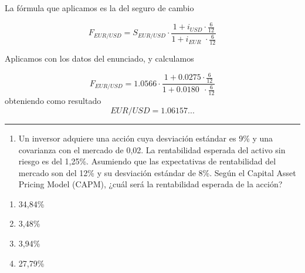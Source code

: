 \documentclass[
  letterpaper,
  DIV=11,
  numbers=noendperiod]{scrreprt}
\providecommand{\tightlist}{%
  \setlength{\itemsep}{0pt}\setlength{\parskip}{0pt}}\usepackage{longtable,booktabs,array}
\begin{document}
\begin{tcolorbox}
\begin{tcolorbox}[enhanced jigsaw, toprule=.15mm, left=2mm, breakable, opacitybacktitle=0.6, toptitle=1mm, coltitle=black, arc=.35mm, leftrule=.75mm, bottomtitle=1mm, titlerule=0mm, title=\textcolor{quarto-callout-tip-color}{\faLightbulb}\hspace{0.5em}{Solución}, rightrule=.15mm, opacityback=0, bottomrule=.15mm, colback=white, colframe=quarto-callout-tip-color-frame, colbacktitle=quarto-callout-tip-color!10!white]

La fórmula que aplicamos es la del seguro de cambio

\[F_{EUR/USD}=S_{EUR/USD}\cdot \frac{1+i_{USD}\cdot \frac{6}{12}}{1+i_{EUR\:\:}\cdot \frac{6}{12}}\]

Aplicamos con los datos del enunciado, y calculamos

\[F_{EUR/USD}=1.0566\cdot \frac{1+0.0275\cdot \frac{6}{12}}{1+0.0180\:\:\cdot \frac{6}{12}}\]
obteniendo como resultado \[EUR/USD = 1.06157...\]

\end{tcolorbox}

\begin{center}\rule{0.5\linewidth}{0.5pt}\end{center}

\begin{enumerate}
\def\labelenumi{\arabic{enumi}.}
\setcounter{enumi}{17}
\tightlist
\item
  Un inversor adquiere una acción cuya desviación estándar es 9\% y una
  covarianza con el mercado de 0,02. La rentabilidad esperada del activo
  sin riesgo es del 1,25\%. Asumiendo que las expectativas de
  rentabilidad del mercado son del 12\% y su desviación estándar de 8\%.
  Según el Capital Asset Pricing Model (CAPM), ¿cuál será la
  rentabilidad esperada de la acción?
\end{enumerate}

\begin{enumerate}
\def\labelenumi{\alph{enumi}.}
\item
  34,84\%
\item
  3,48\%
\item
  3,94\%
\item
  27,79\%
\end{enumerate}

\begin{tcolorbox}[enhanced jigsaw, toprule=.15mm, left=2mm, breakable, opacitybacktitle=0.6, toptitle=1mm, coltitle=black, arc=.35mm, leftrule=.75mm, bottomtitle=1mm, titlerule=0mm, title=\textcolor{quarto-callout-tip-color}{\faLightbulb}\hspace{0.5em}{Solución}, rightrule=.15mm, opacityback=0, bottomrule=.15mm, colback=white, colframe=quarto-callout-tip-color-frame, colbacktitle=quarto-callout-tip-color!10!white]


\end{tcolorbox}
\end{tcolorbox}
\end{document}
